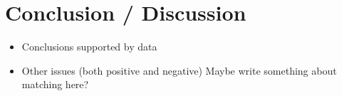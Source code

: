 \documentclass[
]{article}
\begin{document}
\hypertarget{conclusion-discussion}{%
\section{Conclusion / Discussion}\label{conclusion-discussion}}

\begin{itemize}
\item
  Conclusions supported by data
\item
  Other issues (both positive and negative) Maybe write something about matching here?
\end{itemize}

  
\end{document}

